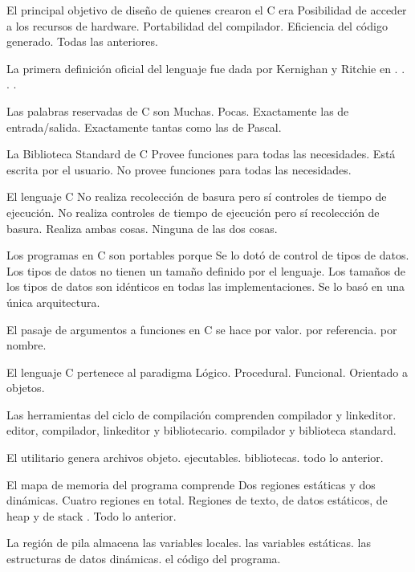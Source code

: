 \begin{preguntas}
\question El principal objetivo de diseño de quienes crearon el C era
\choice Posibilidad de acceder a los recursos de hardware.
\choice Portabilidad del compilador.
\choice Eficiencia del código generado.
\correctchoice Todas las anteriores.

\question La primera definición oficial del lenguaje fue dada por Kernighan y Ritchie en
.
.
.
.

\question Las palabras reservadas de C son
\choice Muchas.
\correctchoice Pocas.
\choice Exactamente las de entrada/salida.
\choice Exactamente tantas como las de Pascal.

\question La Biblioteca Standard de C
\choice Provee funciones para todas las necesidades.
\choice Está escrita por el usuario.
\correctchoice No provee funciones para todas las necesidades.

\question El lenguaje C
\choice No realiza recolección de basura pero sí controles de tiempo de ejecución.
\choice No realiza controles de tiempo de ejecución pero sí recolección de basura.
\choice Realiza ambas cosas.
\correctchoice Ninguna de las dos cosas.

\question Los programas en C son portables porque
\choice Se lo dotó de control de tipos de datos.
\correctchoice Los tipos de datos no tienen un tamaño definido por el lenguaje.
\choice Los tamaños de los tipos de datos son idénticos en todas las implementaciones.
\choice Se lo basó en una única arquitectura.

\question El pasaje de argumentos a funciones en C se hace
\correctchoice por valor.
\choice por referencia.
\choice por nombre.

\question El lenguaje C pertenece al paradigma
\choice Lógico.
\correctchoice Procedural.
\choice Funcional.
\choice Orientado a objetos.

\question Las herramientas del ciclo de compilación comprenden
\choice compilador y linkeditor.
\correctchoice editor, compilador, linkeditor y bibliotecario.
\choice compilador y biblioteca standard.

\question El utilitario  genera
\choice archivos objeto.
\choice ejecutables.
\choice bibliotecas.
\correctchoice todo lo anterior.

\question El mapa de memoria del programa comprende
\choice Dos regiones estáticas y dos dinámicas.
\choice Cuatro regiones en total.
\choice Regiones de texto, de datos estáticos, de heap y de stack .
\correctchoice Todo lo anterior.

\question La región de pila almacena
\correctchoice las variables locales.
\choice las variables estáticas.
\choice las estructuras de datos dinámicas.
\choice el código del programa.
\end{preguntas}
